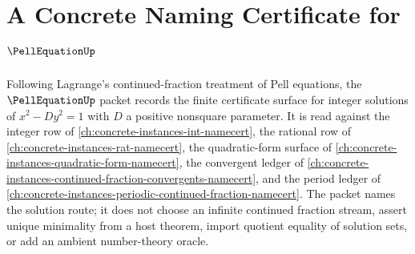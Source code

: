 \chapter{A Concrete Naming Certificate for $\PellEquationUp$}
\label{ch:concrete-instances-pell-equation-namecert}

Following Lagrange's continued-fraction treatment of Pell equations, the $\PellEquationUp$ packet records the finite certificate surface for integer solutions of $x^2-Dy^2=1$ with $D$ a positive nonsquare parameter. It is read against the integer row of \autoref{ch:concrete-instances-int-namecert}, the rational row of \autoref{ch:concrete-instances-rat-namecert}, the quadratic-form surface of \autoref{ch:concrete-instances-quadratic-form-namecert}, the convergent ledger of \autoref{ch:concrete-instances-continued-fraction-convergents-namecert}, and the period ledger of \autoref{ch:concrete-instances-periodic-continued-fraction-namecert}. The packet names the solution route; it does not choose an infinite continued fraction stream, assert unique minimality from a host theorem, import quotient equality of solution sets, or add an ambient number-theory oracle.

